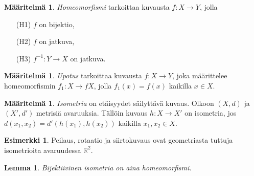 \documentclass[12pt,a4paper,leqno]{report}
\newcommand{\R}{\mathbb{R}}
\theoremstyle{plain}
\newtheorem{lem}[equation]{Lemma}
\theoremstyle{definition}
\newtheorem{maar}[equation]{Määritelmä}
\newtheorem{esim}[equation]{Esimerkki}
\theoremstyle{remark}
\begin{document}
\begin{maar} \emph{Homeomorfismi} 
tarkoittaa kuvausta $f\colon X\rightarrow Y$, jolla 
\begin{itemize}
\item[(H1)] $f$ on bijektio,
\item[(H2)] $f$ on jatkuva,
\item[(H3)] $f^{-1} \colon Y\rightarrow X$ on jatkuva. 
\end{itemize}
\end{maar}

\begin{maar}\emph{Upotus} 
tarkoittaa kuvausta $f\colon X\rightarrow Y$, joka määrittelee homeomorfismin $f_1\colon X\rightarrow fX$, jolla $f_1(x)=f(x)$ kaikilla $x\in X$. %
\end{maar}
\begin{maar}\emph{Isometria}
 on etäisyydet säilyttävä kuvaus. Olkoon $(X,d)$ ja $(X',d')$ metrisiä avaruuksia. %
Tällöin kuvaus $h\colon X\rightarrow X'$ on isometria, jos $d(x_1,x_2)=d'(h(x_1),h(x_2))$ kaikilla $x_1,x_2 \in X$.
\end{maar}
%
\begin{esim}
Peilaus, rotaatio ja siirtokuvaus ovat geometriasta tuttuja isometrioita avaruudessa $\R^2$.
\end{esim}
\begin{lem}\label{isolemma} Bijektiivinen isometria on aina homeomorfismi.
\end{lem}
\end{document}
